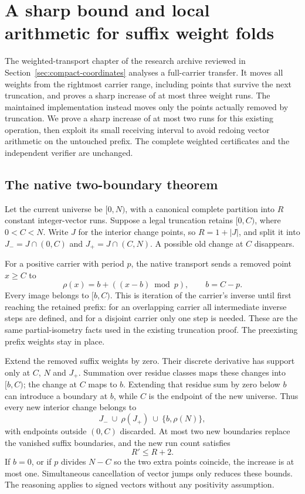 \section{A sharp bound and local arithmetic for suffix weight folds}
\label{sec:suffix-folds}

The weighted-transport chapter of the research archive reviewed in
Section~\ref{sec:compact-coordinates} analyses a full-carrier transfer.
It moves all weights from the rightmost carrier range, including points
that survive the next truncation, and proves a sharp increase of at most
three weight runs. The maintained implementation instead moves only the
points actually removed by truncation. We prove a sharp increase of at
most two runs for this existing operation, then exploit its small receiving
interval to avoid redoing vector arithmetic on the untouched prefix.
The complete weighted certificates and the independent verifier are unchanged.

\subsection{The native two-boundary theorem}

Let the current universe be $[0,N)$, with a canonical complete partition
into $R$ constant integer-vector runs. Suppose a legal truncation retains
$[0,C)$, where $0<C<N$. Write $J$ for the interior change points,
so $R=1+|J|$, and split it into $J_- = J\cap(0,C)$ and
$J_+ = J\cap(C,N)$. A possible old change at $C$ disappears.

For a positive carrier with period $p$, the native transport sends a
removed point $x\ge C$ to
\[
 \rho(x)=b+((x-b)\bmod p),\qquad b=C-p.
\]
Every image belongs to $[b,C)$. This is iteration of the carrier's inverse
until first reaching the retained prefix: for an overlapping carrier all
intermediate inverse steps are defined, and for a disjoint carrier only
one step is needed. These are the same partial-isometry facts used in the
existing truncation proof. The preexisting prefix weights stay in place.

Extend the removed suffix weights by zero. Their discrete derivative has
support only at $C$, $N$ and $J_+$. Summation over residue classes maps
these changes into $[b,C)$; the change at $C$ maps to $b$. Extending that
residue sum by zero below $b$ can introduce a boundary at $b$, while $C$
is the endpoint of the new universe. Thus every new interior change belongs
to
\[
 J_-\ \cup\ \rho(J_+)\ \cup\ \{b,\rho(N)\},
\]
with endpoints outside $(0,C)$ discarded. At most two new boundaries
replace the vanished suffix boundaries, and the new run count satisfies
\[
 R'\le R+2.
\]
If $b=0$, or if $p$ divides $N-C$ so the two extra points coincide, the
increase is at most one. Simultaneous cancellation of vector jumps only
reduces these bounds. The reasoning applies to signed vectors without
any positivity assumption.

